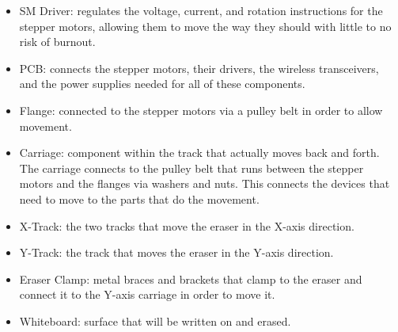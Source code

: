 \begin{itemize}
	\item SM Driver: regulates the voltage, current, and rotation instructions for the stepper motors, allowing them to move the way they should with little to no risk of burnout.
	\item PCB: connects the stepper motors, their drivers, the wireless transceivers, and the power supplies needed for all of these components.
	\item Flange: connected to the stepper motors via a pulley belt in order to allow movement.
	\item Carriage: component within the track that actually moves back and forth. The carriage connects to the pulley belt that runs between the stepper motors and the flanges via washers and nuts. This connects the devices that need to move to the parts that do the movement.
	\item X-Track: the two tracks that move the eraser in the X-axis direction.
	\item Y-Track: the track that moves the eraser in the Y-axis direction.
	\item Eraser Clamp: metal braces and brackets that clamp to the eraser and connect it to the Y-axis carriage in order to move it.
	\item Whiteboard: surface that will be written on and erased.
	 
\end{itemize} \par
